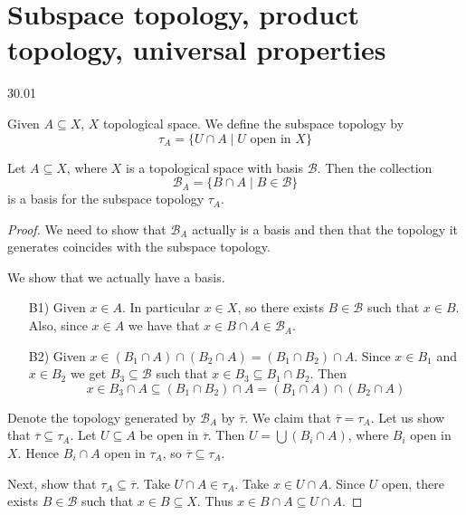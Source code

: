 \section{Subspace topology, product topology, universal properties}
30.01

\begin{definition}
  Given \( A \subseteq X \), \( X \) topological space.
  We define the subspace topology by
  \[
    \tau_A = \{ U \cap A \mid U \text{ open in } X \} 
  \]
\end{definition}

\begin{proposition}
   Let \( A \subseteq X \), where \( X \) is a topological space
   with basis \( \mathscr{B} \). Then the collection
   \[
    \mathscr{B}_A = \{ B \cap A \mid B \in \mathscr{B}\} 
   \]
    is a basis for the subspace topology \( \tau_A \).
\end{proposition}

\begin{proof}
  We need to show that \( \mathscr{B}_A \) actually is a basis
  and then that the topology it generates coincides with the
  subspace topology.
 
  We show that we actually have a basis.
   \begin{enumerate}
     \item[B1)]
       Given \( x \in A \). In particular \( x \in X \),
       so there exists \( B \in \mathscr{B} \) such that
       \( x \in B \). Also, since \( x \in A \) we have that
       \( x \in B \cap A \in \mathscr{B}_A \).
     \item[B2)]
       Given \( x \in (B_1 \cap A) \cap (B_2 \cap A) = (B_1 \cap B_2) \cap A \).
       Since \( x \in B_1 \) and \( x \in B_2 \) we get \( B_3 \subseteq \mathscr{B} \)
       such that \( x \in B_3 \subseteq B_1 \cap B_2 \).
       Then
       \[
        x \in B_3 \cap A \subseteq (B_1 \cap B_2) \cap A = (B_1 \cap A) \cap (B_2 \cap A)
       \]
   \end{enumerate}

   Denote the topology generated by \( \mathscr{B}_A \) by \( \overline{\tau} \).
   We claim that \( \overline{\tau} = \tau_A \).
    Let us show that \( \overline{\tau} \subseteq  \tau_A \).
    Let \( U \subseteq A \) be open in \( \overline{\tau} \).
    Then \( U = \bigcup (B_i \cap A) \), where \( B_i \) open in \( X \).
    Hence \( B_i \cap A \) open in \( \tau_A \), so
    \( \overline{\tau} \subseteq \tau_A \).

    Next, show that \( \tau_A \subseteq \overline{\tau} \).
    Take \( U \cap A \in \tau_A \). Take \( x \in U \cap A \).
    Since \( U  \) open, there exists \( B \in \mathscr{B} \) such that
    \( x \in B \subseteq X \). Thus \( x \in B \cap A \subseteq U \cap A \).
\end{proof}

